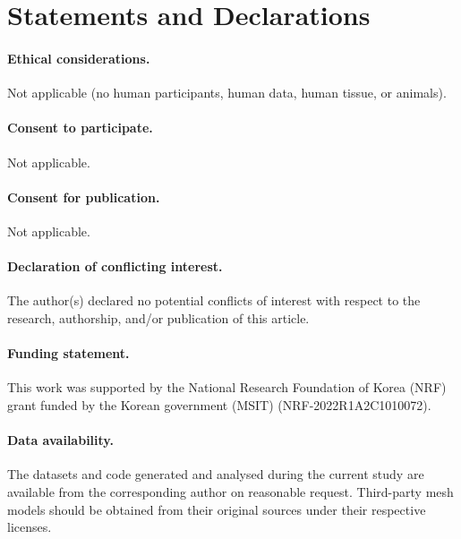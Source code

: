 \documentclass[12pt]{article}
\begin{document}
\section*{Statements and Declarations}

\paragraph{Ethical considerations.} Not applicable (no human participants, human data,
human tissue, or animals).

\paragraph{Consent to participate.} Not applicable.

\paragraph{Consent for publication.} Not applicable.

\paragraph{Declaration of conflicting interest.}
The author(s) declared no potential conflicts of interest with respect to the
research, authorship, and/or publication of this article.

\paragraph{Funding statement.}
This work was supported by the National Research Foundation of Korea (NRF) grant
funded by the Korean government (MSIT) (NRF-2022R1A2C1010072).

\paragraph{Data availability.}
The datasets and code generated and analysed during the current study are available
from the corresponding author on reasonable request. Third-party mesh models should
be obtained from their original sources under their respective licenses.



\end{document}
